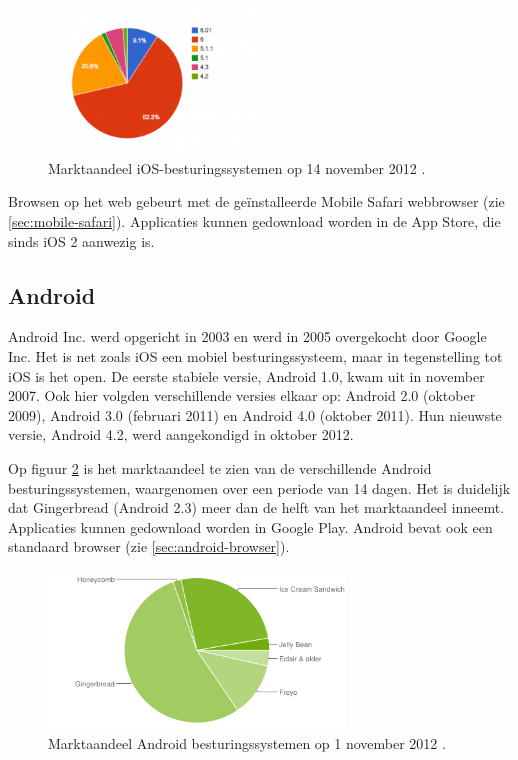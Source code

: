 \begin{figure}
  \centering
  \includegraphics[width=0.5\textwidth]{figuren/marketshare-ios-2012-11-14.png}
  \caption{Marktaandeel iOS-besturingssystemen op 14 november 2012 \cite{Sylvain2012}.}
  \label{fig:marketshare-ios}
\end{figure}

Browsen op het web gebeurt met de geïnstalleerde Mobile Safari webbrowser (zie \ref{sec:mobile-safari}). Applicaties kunnen gedownload worden in de App Store, die sinds iOS 2 aanwezig is. 

\subsection{Android}
Android Inc. werd opgericht in 2003 en werd in 2005 overgekocht door Google Inc. Het is net zoals iOS een mobiel besturingssysteem, maar in tegenstelling tot iOS is het open. De eerste stabiele versie, Android 1.0, kwam uit in november 2007. Ook hier volgden verschillende versies elkaar op: Android 2.0 (oktober 2009), Android 3.0 (februari 2011) en Android 4.0 (oktober 2011). Hun nieuwste versie, Android 4.2, werd aangekondigd in oktober 2012. 

Op figuur \ref{fig:marketshare-android} is het marktaandeel te zien van de verschillende Android besturingssystemen, waargenomen over een periode van 14 dagen. Het is duidelijk dat Gingerbread (Android 2.3) meer dan de helft van het marktaandeel inneemt.
Applicaties kunnen gedownload worden in Google Play. Android bevat ook een standaard browser (zie \ref{sec:android-browser}).

\begin{figure}
  \centering
  \includegraphics[width=0.7\textwidth]{figuren/marketshare-android-2012-11-01.png}
  \caption{Marktaandeel Android besturingssystemen op 1 november 2012 \cite{Android2012}.}
  \label{fig:marketshare-android}
\end{figure}

